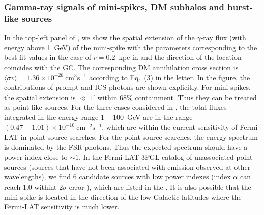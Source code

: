 \subsubsection{Gamma-ray signals of  mini-spikes, DM subhalos and burst-like sources}
In the top-left panel of , 
we show the spatial extension of the $\gamma$-ray flux 
(with energy above 1~GeV) of the mini-spike
with the parameters corresponding to 
the best-fit values  in the case of $r=0.2$~kpc  in 
and the direction of the location  coincides with the GC.
The corresponding DM annihilation cross section is 
$\langle \sigma v\rangle=1.36\times 10^{-26}~\text{cm}^{3}\text{s}^{-1}$ 
according to  Eq.~(3) in the letter. %
In the figure, the contributions of prompt and ICS photons are shown explicitly.
For mini-spikes, the spatial extension is $\ll 1^{\circ}$ within $68\%$ containment. 
Thus they can be treated as point-like sources.
For the three cases considered in , 
the total fluxes integrated in the energy range $1-100$~GeV
are in the range $(0.47-1.01)\times 10^{-10}~\text{cm}^{-2}\text{s}^{-1}$,
which are within the current sensitivity of Fermi-LAT in point-source searches.
For the point-source searches, the energy spectrum is dominated by the FSR photons.
Thus the expected spectrum should have a power index close to $\sim 1$. 
In the Fermi-LAT 3FGL catalog of unassociated point sources
(sources that have not been associated with emission observed at other wavelengths),
we find 6 candidate 
sources with low power indexes (index $\alpha$ can reach 1.0 withint $2\sigma$  error ), 
which are listed in the .
It is also possible that the mini-spike is located in the direction of the low Galactic
latitudes where the Fermi-LAT sensitivity  is much lower. 
